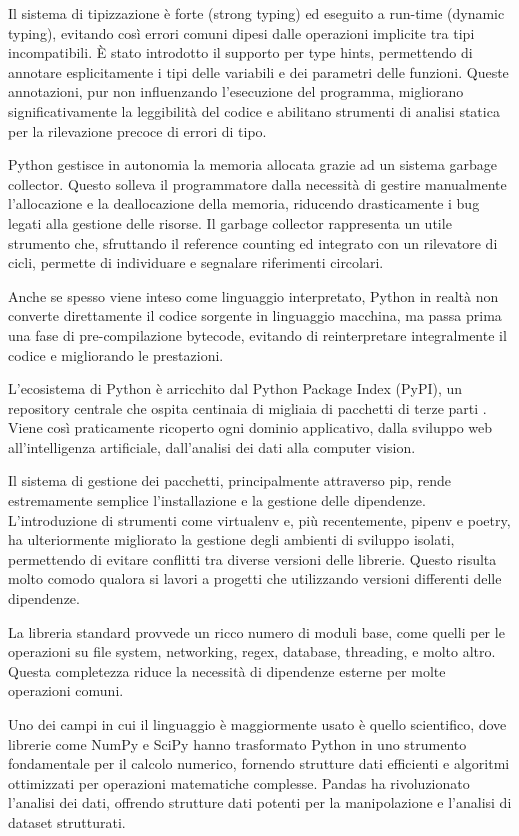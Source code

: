 Il sistema di tipizzazione è forte (strong typing) ed eseguito a run-time (dynamic typing), evitando così errori comuni dipesi dalle operazioni implicite tra tipi incompatibili. È stato introdotto il supporto per type hints, permettendo di annotare esplicitamente i tipi delle variabili e dei parametri delle funzioni. Queste annotazioni, pur non influenzando l'esecuzione del programma, migliorano significativamente la leggibilità del codice e abilitano strumenti di analisi statica per la rilevazione precoce di errori di tipo.

Python gestisce in autonomia la memoria allocata grazie ad un sistema garbage collector. Questo solleva il programmatore dalla necessità di gestire manualmente l'allocazione e la deallocazione della memoria, riducendo drasticamente i bug legati alla gestione delle risorse. Il garbage collector rappresenta un utile strumento che, sfruttando il reference counting ed integrato con un rilevatore di cicli, permette di individuare e segnalare riferimenti circolari.

Anche se spesso viene inteso come linguaggio interpretato, Python in realtà non converte direttamente il codice sorgente in linguaggio macchina, ma passa prima una fase di pre-compilazione bytecode, evitando di reinterpretare integralmente il codice e migliorando le prestazioni.

L'ecosistema di Python è arricchito dal Python Package Index (PyPI), un repository centrale che ospita centinaia di migliaia di pacchetti di terze parti \citep{pypi_2023}. Viene così  praticamente ricoperto ogni dominio applicativo, dalla sviluppo web all'intelligenza artificiale, dall'analisi dei dati alla computer vision.

Il sistema di gestione dei pacchetti, principalmente attraverso pip, rende estremamente semplice l'installazione e la gestione delle dipendenze. L'introduzione di strumenti come virtualenv e, più recentemente, pipenv e poetry, ha ulteriormente migliorato la gestione degli ambienti di sviluppo isolati, permettendo di evitare conflitti tra diverse versioni delle librerie. Questo risulta molto comodo qualora si lavori a progetti che utilizzando versioni differenti delle dipendenze.

La libreria standard provvede un ricco numero di moduli base, come quelli per le operazioni su file system, networking, regex, database, threading, e molto altro. Questa completezza riduce la necessità di dipendenze esterne per molte operazioni comuni.

Uno dei campi in cui il linguaggio è maggiormente usato è quello scientifico, dove librerie come NumPy e SciPy hanno trasformato Python in uno strumento fondamentale per il calcolo numerico, fornendo strutture dati efficienti e algoritmi ottimizzati per operazioni matematiche complesse. Pandas ha rivoluzionato l'analisi dei dati, offrendo strutture dati potenti per la manipolazione e l'analisi di dataset strutturati.

